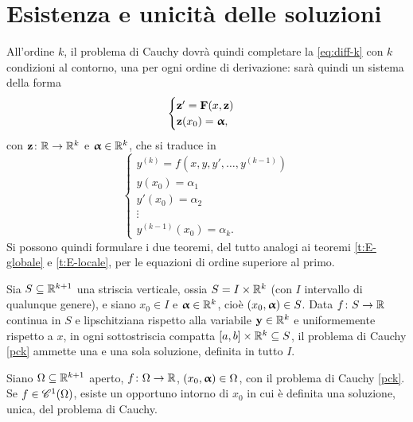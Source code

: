 \section{Esistenza e unicità delle soluzioni}
All'ordine $k$, il problema di Cauchy dovrà quindi completare la \eqref{eq:diff-k} con $k$ condizioni al contorno, una per ogni ordine di derivazione: sarà quindi un sistema della forma
\begin{equation}
\begin{cases}
\vec z'=\vec F(x,\vec z)\\\vec z(x_0)=\valpha,
\end{cases}
\end{equation}
con $\vec z\colon\R\to\R^k$ e $\valpha\in\R^k$, che si traduce in
\begin{equation} \label{pck}
\begin{cases}
y^{(k)}=f(x,y,y',\dots,y^{(k-1)})\\
y(x_0)=\alpha_1\\
y'(x_0)=\alpha_2\\
\vdots\\
y^{(k-1)}(x_0)=\alpha_k.
\end{cases}
\end{equation}
Si possono quindi formulare i due teoremi, del tutto analogi ai teoremi \ref{t:E-globale} e \ref{t:E-locale}, per le equazioni di ordine superiore al primo.

\begin{teorema}
Sia $S\subseteq\R^{k+1}$ una striscia verticale, ossia $S=I\times\R^k$ (con $I$ intervallo di qualunque genere), e siano $x_0\in I$ e $\valpha\in\R^k$, cioè $(x_0,\valpha)\in S$. Data $f\colon S\to\R$ continua in $S$ e lipschitziana rispetto alla variabile $\vec y\in\R^k$ e uniformemente rispetto a $x$, in ogni sottostriscia compatta $[a,b]\times\R^k\subseteq S$, il problema di Cauchy \eqref{pck} ammette una e una sola soluzione, definita in tutto $I$.
\end{teorema}
\begin{teorema}
Siano $\Omega\subseteq\R^{k+1}$ aperto, $f\colon\Omega\to\R$, $(x_0,\valpha)\in\Omega$, con il problema di Cauchy \eqref{pck}. Se $f\in\cont[1]{\Omega}$, esiste un opportuno intorno di $x_0$ in cui è definita una soluzione, unica, del problema di Cauchy.
\end{teorema}

